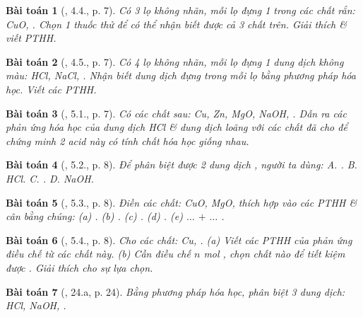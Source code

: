\documentclass{article}
\newtheorem{baitoan}{Bài toán}
\begin{document}
\begin{baitoan}[\cite{SBT_Hoa_Hoc_9}, 4.4., p. 7]
	Có 3 lọ không nhãn, mỗi lọ đựng 1 trong các chất rắn: \emph{CuO, }. Chọn 1 thuốc thử để có thể nhận biết được cả 3 chất trên. Giải thích \& viết PTHH.
\end{baitoan}

\begin{baitoan}[\cite{SBT_Hoa_Hoc_9}, 4.5., p. 7]
	Có 4 lọ không nhãn, mỗi lọ đựng 1 dung dịch không màu: \emph{HCl, NaCl, }. Nhận biết dung dịch đựng trong mỗi lọ bằng phương pháp hóa học. Viết các PTHH.
\end{baitoan}

\begin{baitoan}[\cite{SBT_Hoa_Hoc_9}, 5.1., p. 7]
	Có các chất sau: \emph{Cu, Zn, MgO, NaOH, }. Dẫn ra các phản ứng hóa học của dung dịch \emph{HCl} \& dung dịch \emph{} loãng với các chất đã cho để chứng minh 2 acid này có tính chất hóa học giống nhau.
\end{baitoan}

\begin{baitoan}[\cite{SBT_Hoa_Hoc_9}, 5.2., p. 8]
	Để phân biệt được 2 dung dịch \emph{}, người ta dùng: {\sf A.} \emph{}. {\sf B.} \emph{HCl}. {\sf C.} \emph{}. {\sf D.} \emph{NaOH}.
\end{baitoan}

\begin{baitoan}[\cite{SBT_Hoa_Hoc_9}, 5.3., p. 8]
	Điền các chất: \emph{CuO, MgO, } thích hợp vào các PTHH \& cân bằng chúng: (a) \emph{}. (b) \emph{}. (c) \emph{}. (d) \emph{}. (e) $\ldots$ $+$ $\ldots$ \emph{}.
\end{baitoan}

\begin{baitoan}[\cite{SBT_Hoa_Hoc_9}, 5.4., p. 8]
	Cho các chất: \emph{Cu, }. (a) Viết các PTHH của phản ứng điều chế \emph{} từ các chất này. (b) Cần điều chế $n$ \emph{mol }, chọn chất nào để tiết kiệm được \emph{}. Giải thích cho sự lựa chọn.
\end{baitoan}

\begin{baitoan}[\cite{An_350_BT_Hoa_Hoc_9}, 24.a, p. 24]
	Bằng phương pháp hóa học, phân biệt 3 dung dịch: \emph{HCl, NaOH, }.
\end{baitoan}
\end{document}

